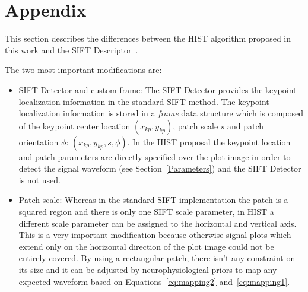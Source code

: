 \documentclass[utf8]{frontiersSCNS} %
\begin{document}
%
%



\section{Appendix}
\label{Appendix}

This section describes the  differences between the HIST algorithm proposed in this work and the SIFT Descriptor~\citep{Vedaldi2010}.

The two most important modifications are:

\begin{itemize}
\item SIFT Detector and custom frame: The SIFT Detector provides the keypoint localization information in the standard SIFT method. The keypoint localization information is stored in a \textit{frame} data structure which is composed of the keypoint center location  $(x_{kp}, y_{kp})$, patch scale  $s$ and patch orientation $\phi$: $ ( x_{kp}, y_{kp}, s, \phi ) $.  In the HIST proposal the keypoint location and patch parameters are directly specified over the plot image in order to detect the signal waveform (see Section~\ref{Parameters}) and the SIFT Detector is not used.
\item Patch scale: Whereas in the standard SIFT implementation the patch is a squared region and there is only one SIFT scale parameter, in HIST a different scale parameter can be assigned to the horizontal and vertical axis.  This is a very important modification because otherwise signal plots which extend only on the horizontal direction of the plot image could not be entirely covered.  By using a rectangular patch, there isn't any constraint on its size and it can be adjusted by neurophysiological priors to map any expected waveform based on Equations~\ref{eq:mapping2} and~\ref{eq:mapping1}.
\end{itemize}
\end{document}
